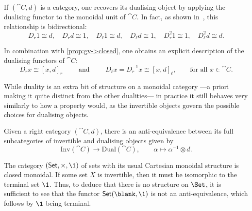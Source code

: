 \begin{remark}\label{rmk:gv-d-from-D}
  If \((\cat{C},d)\) is a \GV{} category,
  one recovers its dualising object by
  applying the dualising functor to the monoidal unit of \(\cat{C}\).
  In fact, as shown in~\cite[Remark~2.1.(4)]{boyarchenko13:groth-verdier},
  this relationship is bidirectional:
  \begin{equation}\label{eq:gv:1:from:d:and:d:from:1}
    D_r 1 \cong d, \quad
    D_r d \cong 1, \quad
    D_{\ell} 1 \cong d, \quad
    D_{\ell} d \cong 1, \quad
    D_r^2 1 \cong 1, \quad
    D_{\ell}^2d \cong d.
  \end{equation}

  In combination with \cref{prop:gv->closed},
  one obtains an explicit description of the dualising functors of \(\cat{C}\):
  \begin{equation}\label{eq:gv-dualising-from-internal-hom-vice-versa}
    D_r x \cong {[x, d]}_r \qquad \text{ and } \qquad
    D_{\ell}x = D_r^{-1}x \cong {[x, d]}_{\ell}, \qquad \text{for all }x \in \cat{C}.
  \end{equation}
\end{remark}

While \GV{} duality is an extra bit of structure on a monoidal category%
—a priori making it quite distinct from the other dualities—%
in practice it still behaves very similarly to how a property would,
as the invertible objects govern the possible choices for dualising objects.

\begin{lemma}\label{lem:choices-of-dualising-objects}
  Given a right \GV{} category \((\cat{C},d)\), there is an anti\hyp{}equiva\-lence between its full subcategories of invertible and dualising objects given by
  \[
    \mathrm{Inv}(\cat{C}) \to \mathrm{Dual}(\cat{C}), \qquad\alpha \mapsto \alpha^{-1}\otimes d.
  \]
\end{lemma}

\begin{example}\label{rmk:closed-but-not-gv}
  The category \((\mathsf{Set}, \times, \1)\) of sets
  with its usual Cartesian monoidal structure is closed monoidal.
  If some set \(X\) is invertible,
  then it must be isomorphic to the terminal set \(\1\).
  Thus, to deduce that there is no \GV{} structure on \(\Set\),
  it is sufficient to see that the functor \(\mathsf{Set}(\blank, \1)\) is not an anti\hyp{}equivalence,
  which follows by \(\1\) being terminal.
\end{example}

